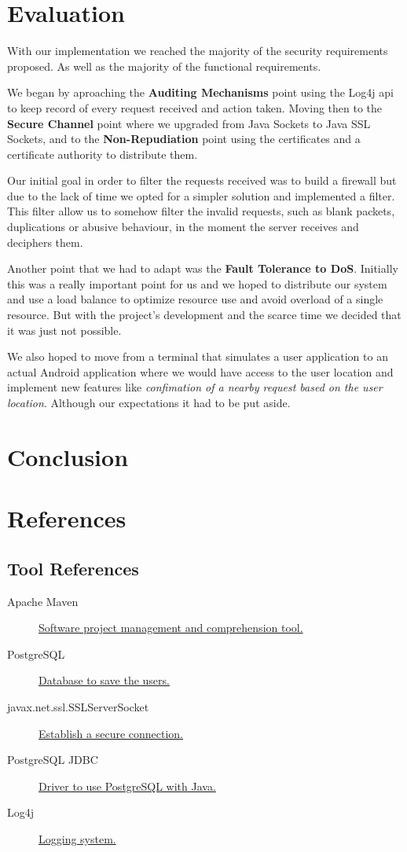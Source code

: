 \documentclass[a4paper,titlepage,11pt]{article}
\begin{document}
\section{Evaluation}
With our implementation we reached the majority of the security requirements proposed. As well as the majority of the
functional requirements.

We began by aproaching the \textbf{Auditing Mechanisms} point using the Log4j api to keep record of every request received and
action taken. Moving then to the \textbf{Secure Channel} point where we upgraded from Java Sockets to Java SSL Sockets, and to the
\textbf{Non-Repudiation} point using the certificates and a certificate authority to distribute them.

Our initial goal in order to filter the requests received was to build a firewall but due to the lack of time we opted for a
simpler solution and implemented a filter. This filter allow us to somehow filter the invalid requests, such as blank packets, duplications or abusive behaviour, in the moment the server
receives and deciphers them.

Another point that we had to adapt was the \textbf{Fault Tolerance to DoS}. Initially this was a really important point for us and we
hoped to distribute our system and use a load balance to optimize resource use and avoid overload of a single resource. But with the
project's development and the scarce time we decided that it was just not possible.

We also hoped to move from a terminal that simulates a user application to an actual Android application where we would have access to
the user location and implement new features like \textit{confimation of a nearby request based on the user location}. Although our
expectations it had to be put aside.

\section{Conclusion}

\section{References}

\subsection{Tool References}
\begin{description}
  \item [Apache Maven] \href{https://maven.apache.org}{Software project management and comprehension tool.}
  \item [PostgreSQL] \href{https://www.postgresql.org}{Database to save the users.}
  \item [javax.net.ssl.SSLServerSocket] \href{https://docs.oracle.com/javase/7/docs/api/java/net/Socket.html}{Establish a secure connection.}
  \item [PostgreSQL JDBC] \href{https://jdbc.postgresql.org}{Driver to use PostgreSQL with Java.}
  \item [Log4j] \href{http://logging.apache.org/log4j/2.x/}{Logging system.}
\end{description}
\end{document}
